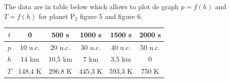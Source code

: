 \begin{description}
The data are in table below which allows to plot de graph $p = f(h)$ and $T = f(h)$ for
planet P$_2$ figure 5 and figure 6. %
\begin{center}
\begin{tabular}{|c|c|c|c|c|c|}
\hline
$t$ & 0 & 500 s & 1000 s & 1500 s & 2000 s\\
\hline
$p$ & 10 u.c. & 20 u.c. & 30 u.c. & 40 u.c. & 50 u.c.\\
\hline
$h$ & 14 km & 10,5 km & 7 km & 3,5 km & 0\\
\hline
$T$ & 148,4 K & 296,8 K & 445,3 K & 593,3 K & 750 K\\
\hline
\end{tabular}
\end{center}
\end{description}

